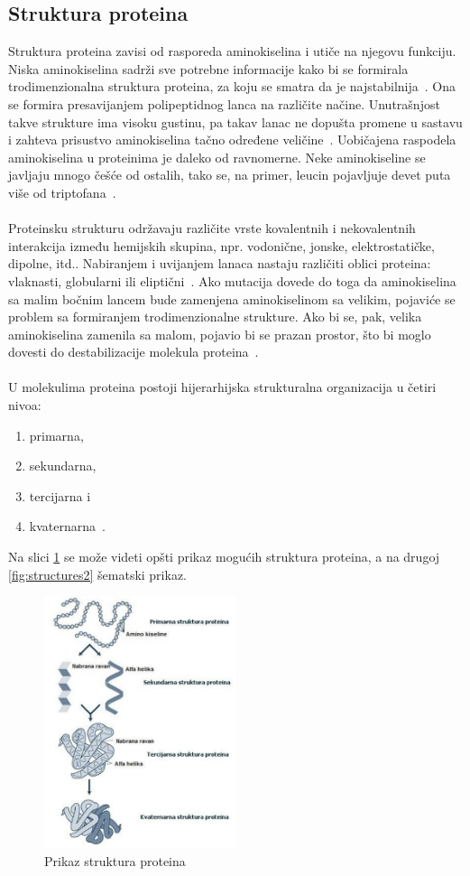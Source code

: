\subsection{Struktura proteina}
Struktura proteina zavisi od rasporeda aminokiselina i utiče na njegovu funkciju. Niska aminokiselina sadrži sve potrebne informacije kako bi se formirala trodimenzionalna struktura proteina, za koju se smatra da je najstabilnija~\cite{biopathways}. Ona se formira presavijanjem polipeptidnog lanca na različite načine. Unutrašnjost takve strukture ima visoku gustinu, pa takav lanac ne dopušta promene u sastavu i zahteva prisustvo aminokiselina tačno određene veličine~\cite{spasic}.
Uobičajena raspodela aminokiselina u proteinima je daleko od ravnomerne. Neke aminokiseline se javljaju mnogo češće od ostalih, tako se, na primer, leucin pojavljuje devet puta više od triptofana~\cite{biopathways}. \\\\
Proteinsku strukturu održavaju različite vrste kovalentnih i nekovalentnih interakcija između hemijskih skupina, npr. vodonične, jonske, elektrostatičke, dipolne, itd.. Nabiranjem i uvijanjem lanaca nastaju različiti oblici proteina: vlaknasti, globularni ili eliptični~\cite{medbio}.
Ako mutacija dovede do toga da aminokiselina sa malim bočnim lancem bude zamenjena aminokiselinom sa velikim, pojaviće se problem sa formiranjem trodimenzionalne strukture. Ako bi se, pak, velika aminokiselina zamenila sa malom, pojavio bi se prazan prostor, što bi moglo dovesti do destabilizacije molekula proteina~\cite{spasic}. \\\\
U molekulima proteina postoji hijerarhijska strukturalna organizacija u četiri nivoa:
\begin{enumerate}
\item primarna,
\item sekundarna,
\item tercijarna i
\item kvaternarna~\cite{spasic}.
\end{enumerate}
Na slici \ref{fig:structures} se može videti opšti prikaz mogućih struktura proteina, a na drugoj \ref{fig:structures2} šematski prikaz.
\begin{figure}[h]
	\centering
    \includegraphics[width=0.5\textwidth]{Figures/BO/protein_structures.png}
    \caption{Prikaz struktura proteina}
    \label{fig:structures}
\end{figure}
